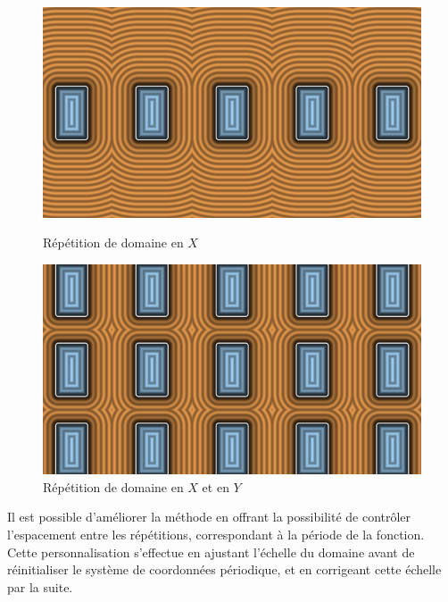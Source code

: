 \begin{figure}[h]
  \begin{minipage}[b]{0.45\linewidth}
    \centering
    \includegraphics[width=\linewidth]{images/sdf/repet00.png}
    \caption{Répétition de domaine en $X$}
    \label{repet00}
  \end{minipage}
  \hspace{0.1\linewidth} %
  \begin{minipage}[b]{0.45\linewidth}
    \centering
    \includegraphics[width=\linewidth]{images/sdf/repet01.png}
    \caption{Répétition de domaine en $X$ et en $Y$}
    \label{repet01}
  \end{minipage}
\end{figure}

 Il est possible d'améliorer la méthode en offrant la possibilité de contrôler l'espacement entre les répétitions, correspondant à la période de la fonction. Cette personnalisation s'effectue en ajustant l'échelle du domaine avant de réinitialiser le système de coordonnées périodique, et en corrigeant cette échelle par la suite.

